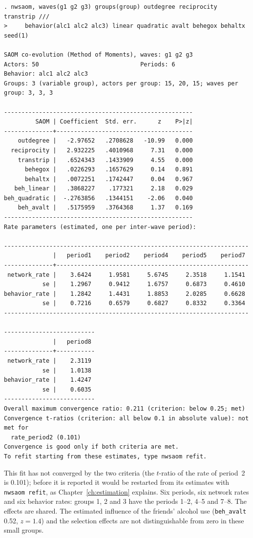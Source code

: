 \begin{lstlisting}
. nwsaom, waves(g1 g2 g3) groups(group) outdegree reciprocity transtrip ///
>     behavior(alc1 alc2 alc3) linear quadratic avalt behegox behaltx seed(1)

SAOM co-evolution (Method of Moments), waves: g1 g2 g3
Actors: 50                             Periods: 6
Behavior: alc1 alc2 alc3
Groups: 3 (variable group), actors per group: 15, 20, 15; waves per group: 3, 3, 3

------------------------------------------------------
         SAOM | Coefficient  Std. err.      z    P>|z|
--------------+---------------------------------------
    outdegree |   -2.97652   .2708628   -10.99   0.000
  reciprocity |   2.932225   .4010968     7.31   0.000
    transtrip |   .6524343   .1433909     4.55   0.000
      behegox |   .0226293   .1657629     0.14   0.891
      behaltx |   .0072251   .1742447     0.04   0.967
   beh_linear |   .3868227    .177321     2.18   0.029
beh_quadratic |  -.2763856   .1344151    -2.06   0.040
    beh_avalt |   .5175959   .3764368     1.37   0.169
------------------------------------------------------
Rate parameters (estimated, one per inter-wave period):

----------------------------------------------------------------------
              |   period1    period2    period4    period5    period7
--------------+-------------------------------------------------------
 network_rate |    3.6424     1.9581     5.6745     2.3518     1.1541
           se |    1.2967     0.9412     1.6757     0.6873     0.4610
behavior_rate |    1.2842     1.4431     1.8853     2.0285     0.6628
           se |    0.7216     0.6579     0.6827     0.8332     0.3364
----------------------------------------------------------------------

--------------------------
              |   period8
--------------+-----------
 network_rate |    2.3119
           se |    1.0138
behavior_rate |    1.4247
           se |    0.6035
--------------------------
Overall maximum convergence ratio: 0.211 (criterion: below 0.25; met)
Convergence t-ratios (criterion: all below 0.1 in absolute value): not met for
  rate_period2 (0.101)
Convergence is good only if both criteria are met.
To refit starting from these estimates, type nwsaom refit.
\end{lstlisting}
This fit has not converged by the two criteria (the $t$-ratio of the rate of period~2 is 0.101); before it is reported it would be restarted from its estimates with \texttt{nwsaom refit}, as Chapter~\ref{ch:estimation} explains. Six periods, six network rates and six behavior rates: groups 1, 2 and 3 have the periods 1--2, 4--5 and 7--8. The effects are shared. The estimated influence of the friends' alcohol use (\texttt{beh\_avalt} 0.52, $z=1.4$) and the selection effects are not distinguishable from zero in these small groups.

